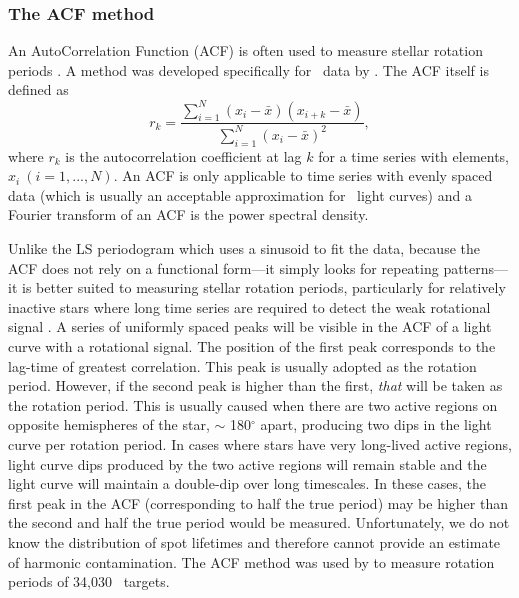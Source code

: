 \subsubsection{The ACF method}

An AutoCorrelation Function (ACF) is often used to measure stellar rotation
periods \citep[\eg][]{Aigrain2008, Mcquillan2013, Mcquillan13b,
Mcquillan2014, Garcia2014}.
A method was developed specifically for \kepler\ data by
\citet{Mcquillan2013}.
The ACF itself is defined as
\begin{equation}
    r_k = \frac{\sum_{i=1}^{N}(x_i-\bar{x})(x_{i+k}-\bar{x})}
    {\sum_{i=1}^{N}(x_i-\bar{x})^2},
\end{equation}
where $r_k$ is the autocorrelation coefficient at lag $k$ for a time series
with elements, $x_i~(i=1,..., N)$.
An ACF is only applicable to time series with evenly spaced data (which is
usually an acceptable approximation for \kepler\ light curves) and a Fourier
transform of an ACF is the power spectral density.

Unlike the LS periodogram which uses a sinusoid to fit the data, because the
ACF does not rely on a functional form---it simply looks for repeating
patterns---it is better suited to measuring stellar rotation periods,
particularly for relatively inactive stars where long time series are required
to detect the weak rotational signal \citep[see][for an in-depth
discussion]{Mcquillan2014}.
A series of uniformly spaced peaks will be visible in the ACF of a light curve
with a rotational signal.
The position of the first peak corresponds to the lag-time of greatest
correlation.
This peak is usually adopted as the rotation period.
However, if the second peak is higher than the first, {\it that} will be taken
as the rotation period.
This is usually caused when there are two active regions on opposite
hemispheres of the star, $\sim$ 180$^\circ$ apart, producing two dips in the
light curve per rotation period.
In cases where stars have very long-lived active regions, light curve dips
produced by the two active regions will remain stable and the light curve will
maintain a double-dip over long timescales.
In these cases, the first peak in the ACF (corresponding to half the true
period) may be higher than the second and half the true period would be
measured.
Unfortunately, we do not know the distribution of spot lifetimes and therefore
cannot provide an estimate of harmonic contamination.
The ACF method was used by \citet{Mcquillan2014} to measure rotation periods
of 34,030 \kepler\ targets.

